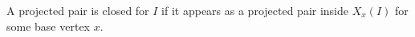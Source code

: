 \begin{definition}
A projected pair is closed for \(I\) if it appears as a projected pair inside
\(X_x(I)\) for some base vertex \(x\).
\end{definition}
